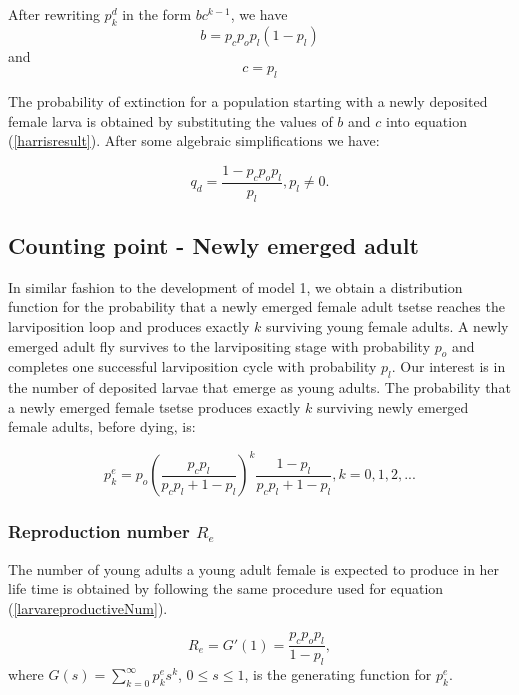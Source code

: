 After rewriting $p_{k}^{d}$ in the form $bc^{k-1}$, we have  $$b = p_{c}p_{o}p_{l}(1-p_{l})$$ and $$c = p_{l}$$ 

The probability of extinction for a population starting with a newly deposited  female larva is obtained by substituting the values of $b$ and $c$ into equation (\ref{harrisresult}). After some algebraic simplifications we have:

\begin{equation}
\label{extictionLarva}
q_{d} = \frac{1-p_{c}p_{o}p_{l}}{p_{l}}, p_{l} \neq 0.
\end{equation}



\subsection{Counting point - Newly emerged adult}

In similar fashion to the development of model 1, we obtain a distribution function for the probability that a newly emerged female adult tsetse reaches the larviposition loop and produces exactly $k$ surviving young female adults.
A newly emerged adult fly survives to the larvipositing stage  with probability $p_{o}$  and  completes one successful larviposition cycle with probability $p_{l}$. Our interest is in the number of deposited larvae that emerge as young adults. The probability that a newly emerged female tsetse produces exactly $k$ surviving newly emerged female adults, before dying, is: 

\begin{equation}
\label{distributionYoungadult}
p_{k}^{e} = p_{o}(\frac{p_{c}p_{l}}{p_{c}p_{l} + 1 - p_{l}} )^{k}\frac{1-p_{l}}{p_{c}p_{l} + 1 - p_{l}}, k =0,1,2,...
\end{equation}      

\subsubsection{Reproduction number $R_{e}$}

The number of young adults a young adult female is expected to produce in her life time is obtained by following the same procedure used for equation (\ref{larvareproductiveNum}).

\begin{equation}
\label{YoungAdulreproductiveNum}
R_{e} = G'(1) = \frac{p_{c}p_{o}p_{l}}{1-p_{l}},
\end{equation}  
where $G(s) = \sum_{k=0}^{\infty} p_{k}^{e}s^{k}  $, $0\leq s \leq 1$, is the generating function for $p_{k}^{e}$.

